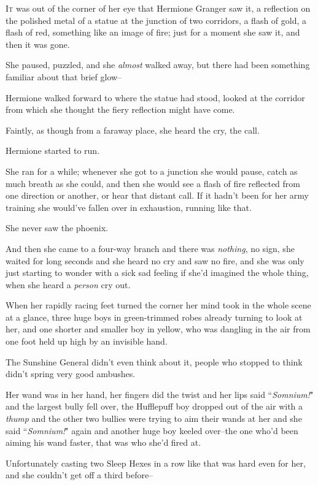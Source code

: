 
\lettrine{I}{t} was out of the corner of her eye that Hermione Granger saw it, a reflection on the polished metal of a statue at the junction of two corridors, a flash of gold, a flash of red, something like an image of fire; just for a moment she saw it, and then it was gone.

She paused, puzzled, and she \emph{almost} walked away, but there had been something familiar about that brief glow\---

Hermione walked forward to where the statue had stood, looked at the corridor from which she thought the fiery reflection might have come.

Faintly, as though from a faraway place, she heard the cry, the call.

Hermione started to run.

She ran for a while; whenever she got to a junction she would pause, catch as much breath as she could, and then she would see a flash of fire reflected from one direction or another, or hear that distant call. If it hadn't been for her army training she would've fallen over in exhaustion, running like that.

She never saw the phoenix.

And then she came to a four-way branch and there was \emph{nothing}, no sign, she waited for long seconds and she heard no cry and saw no fire, and she was only just starting to wonder with a sick sad feeling if she'd imagined the whole thing, when she heard a \emph{person} cry out.

When her rapidly racing feet turned the corner her mind took in the whole scene at a glance, three huge boys in green-trimmed robes already turning to look at her, and one shorter and smaller boy in yellow, who was dangling in the air from one foot held up high by an invisible hand.

The Sunshine General didn't even think about it, people who stopped to think didn't spring very good ambushes.

Her wand was in her hand, her fingers did the twist and her lips said ``\emph{Somnium!}" and the largest bully fell over, the Hufflepuff boy dropped out of the air with a \emph{thump} and the other two bullies were trying to aim their wands at her and she said ``\emph{Somnium!}" again and another huge boy keeled over\---the one who'd been aiming his wand faster, that was who she'd fired at.

Unfortunately casting two Sleep Hexes in a row like that was hard even for her, and she couldn't get off a third before\---

